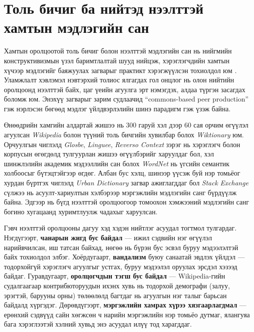 \section{Толь бичиг ба нийтэд нээлттэй хамтын мэдлэгийн сан}

Хамтын оролцоотой толь бичиг болон нээлттэй мэдлэгийн сан нь нийгмийн конструктивизмын үзэл баримтлалтай шууд нийцэж, хэрэглэгчдийн хамтын хүчээр мэдлэгийг баяжуулах загварыг практикт хэрэгжүүлсэн тохиолдол юм \cite{Vygotsky1978}. Уламжлалт хэвлэмэл нэвтэрхий толиос ялгагдах гол онцлог нь олон нийтийн оролцоонд нээлттэй байх, цаг үеийн агуулга эрт нэмэгдэх, алдаа түргэн засагдах боломж юм. Энэхүү загварыг зарим судлаачид ``commons-based peer production'' \cite{Benkler2006} гэж нэрлэсэн бөгөөд мэдлэг үйлдвэрлэлийн шинэ парадигм гэж үзэж байна.

Өнөөдрийн хамгийн алдартай жишээ нь 300 гаруй хэл дээр 60 сая орчим өгүүлэл агуулсан \textit{Wikipedia} болон түүний толь бичгийн хувилбар болох \textit{Wiktionary} юм. Орчуулгын чиглэлд \textit{Glosbe}, \textit{Linguee}, \textit{Reverso Context} зэрэг нь хэрэглэгч болон корпусын өгөгдөлд тулгуурлан жишээ өгүүлбэрийг харуулдаг бол, хэл шинжлэлийн академик мэдээллийн сан болох \textit{WordNet} нь үгсийн семантик холбоосыг бүтэцтэйгээр өгдөг. Албан бус хэлц, шинээр үүсэж буй нэр томьёог хурдан бүртгэх чиглэлд \textit{Urban Dictionary} загвар ажиглагддаг бол \textit{Stack Exchange} сүлжээ нь асуулт-хариултын хэлбэрээр мэргэжлийн мэдлэгийн санг бүрдүүлж байна. Эдгээр нь бүгд нээлттэй оролцоогоор томоохон хэмжээний мэдлэгийн санг богино хугацаанд хуримтлуулж чадахыг харуулсан.

Гэвч нээлттэй оролцооны дагуу хэд хэдэн нийтлэг асуудал тогтмол тулгардаг. Нэгдүгээрт, \textbf{чанарын жигд бус байдал} — ижил сэдвийн нэг өгүүлэл нарийвчилсан, иш татсан байхад, нөгөө нь бүрэн бус эсвэл буруу мэдээлэлтэй байх тохиолдол элбэг. Хоёрдугаарт, \textbf{вандализм} буюу санаатай эвдлэх үйлдэл — тодорхойгүй хэрэглэгч агуулгыг устгах, буруу мэдээлэл оруулах эрсдэл хэзээд байдаг. Гуравдугаарт, \textbf{оролцогчдын тэгш бус байдал} — Wikipedia-гийн судалгаагаар контрибюторуудын ихэнх хувь нь тодорхой демографи (залуу, эрэгтэй, барууны орны) төлөөлөлд багтдаг нь агуулгын нэг талыг барьсан байдалд хүргэдэг. Дөрөвдүгээрт, \textbf{мэргэжлийн хамрах хүрээ хязгаарлагдмал} — ерөнхий сэдвүүд сайн хөгжсөн ч нарийн мэргэжлийн нэр томьёо дутмаг, ялангуяа бага хэрэглээтэй хэлний хувьд энэ асуудал илүү тод харагддаг.

